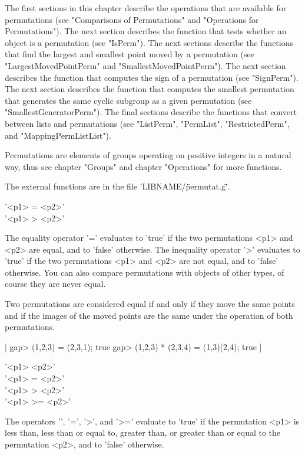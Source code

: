 The first  sections  in  this chapter describe  the  operations that  are
available  for  permutations  (see  "Comparisons  of  Permutations"   and
"Operations for Permutations").   The next section describes the function
that  tests whether an object is a permutation (see "IsPerm").   The next
sections describe the functions that find the largest and smallest  point
moved    by    a    permutation    (see    "LargestMovedPointPerm"    and
"SmallestMovedPointPerm").  The next section describes  the function that
computes  the sign  of a permutation (see "SignPerm").  The next  section
describes the  function  that  computes  the  smallest  permutation  that
generates  the   same  cyclic  subgroup  as  a  given  permutation   (see
"SmallestGeneratorPerm").  The final sections describe the functions that
convert  between  lists and  permutations  (see  "ListPerm",  "PermList",
"RestrictedPerm", and "MappingPermListList").

Permutations are  elements  of groups operating on positive integers in a
natural way, thus see chapter "Groups"  and chapter "Operations" for more
functions.

The external functions are in the file 'LIBNAME/\"permutat.g\"'.

%

'<p1> = <p2>' \\
'<p1> \<> <p2>'

The  equality operator  '=' evaluates to  'true'  if the two permutations
<p1> and  <p2> are equal,  and  to  'false'  otherwise.   The  inequality
operator '\<>' evaluates to 'true' if the two permutations <p1>  and <p2>
are  not  equal,  and  to  'false'   otherwise.   You  can  also  compare
permutations with objects of other types, of course they are never equal.

Two permutations are considered equal  if and  only if they move the same
points and if  the images  of the  moved  points are  the  same under the
operation of both permutations.

|    gap> (1,2,3) = (2,3,1);
    true
    gap> (1,2,3) * (2,3,4) = (1,3)(2,4);
    true |

'<p1> \<  <p2>' \\
'<p1> \<= <p2>' \\
'<p1>  >  <p2>' \\
'<p1>  >= <p2>'

The operators '\<',  '\<=',  '>',  and  '>='  evaluate  to 'true'  if the
permutation <p1> is less  than,  less than or  equal to, greater than, or
greater than or equal to the permutation <p2>, and to 'false' otherwise.

